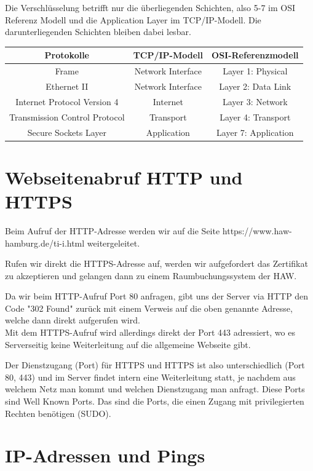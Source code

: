 \documentclass[paper=a4, fontsize=11pt]{scrreprt}
\numberwithin{equation}{section}
\numberwithin{figure}{section}
\numberwithin{table}{section}
\begin{document}
Die Verschlüsselung betrifft nur die überliegenden Schichten, also 5-7 im OSI Referenz Modell und die Application Layer im TCP/IP-Modell. Die darunterliegenden Schichten bleiben dabei lesbar.
\begin{center}
\begin{tabular}{|c|c|c|}
 \hline
 \textbf{Protokolle} & \textbf{TCP/IP-Modell} & \textbf{OSI-Referenzmodell} \\
 \hline
 Frame & Network Interface & Layer 1: Physical \\
 \hline
 Ethernet II & Network Interface & Layer 2: Data Link \\
 \hline
 Internet Protocol Version 4 & Internet & Layer 3: Network \\
 \hline
 Transmission Control Protocol & Transport & Layer 4: Transport\\
 \hline
 Secure Sockets Layer & Application &  Layer 7: Application\\
 \hline
\end{tabular}
\end{center}

\section{Webseitenabruf HTTP und HTTPS}

Beim Aufruf der HTTP-Adresse werden wir auf die Seite https://www.haw-hamburg.de/ti-i.html weitergeleitet.

Rufen wir direkt die HTTPS-Adresse auf, werden wir aufgefordert das Zertifikat zu akzeptieren und gelangen dann zu einem Raumbuchungssystem der HAW.

Da wir beim HTTP-Aufruf Port 80 anfragen, gibt uns der Server via HTTP den Code "302 Found" zurück mit einem Verweis auf die oben genannte Adresse, welche dann direkt aufgerufen wird.\\

Mit dem HTTPS-Aufruf wird allerdings direkt der Port 443 adressiert, wo es Serverseitig keine Weiterleitung auf die allgemeine Webseite gibt.

Der Dienstzugang (Port) für HTTPS und HTTPS ist also unterschiedlich (Port 80, 443) und im Server findet intern eine Weiterleitung statt, je nachdem aus welchem Netz man kommt und welchen Dienstzugang man anfragt. Diese Ports sind Well Known Ports. Das sind die Ports, die einen Zugang mit privilegierten Rechten benötigen (SUDO).

\section{IP-Adressen und Pings}
\end{document}
